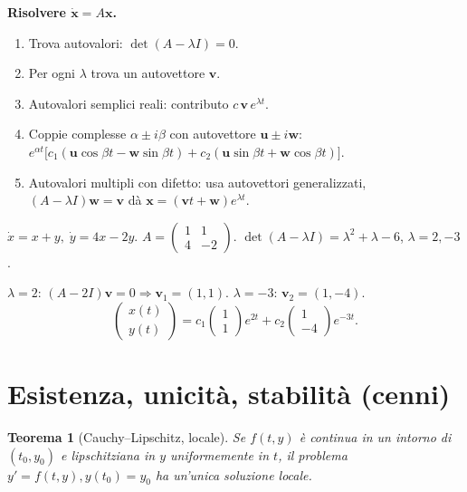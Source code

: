 \documentclass[11pt,a4paper,openany]{book}
\theoremstyle{plain}
\newtheorem{teorema}{Teorema}[chapter]
\theoremstyle{definition}
\theoremstyle{remark}
\renewcommand{\vec}[1]{\mathbf{#1}}
\begin{document}
\begin{ricetta}
\textbf{Risolvere $\dot{\vec{x}}=A\vec{x}$.}
\begin{enumerate}[leftmargin=*]
  \item Trova autovalori: $\det(A-\lambda I)=0$.
  \item Per ogni $\lambda$ trova un autovettore $\vec{v}$.
  \item Autovalori semplici reali: contributo $c\,\vec{v}\,e^{\lambda t}$.
  \item Coppie complesse $\alpha\pm i\beta$ con autovettore $\vec{u}\pm i\vec{w}$:
        $e^{\alpha t}\bigl[c_1(\vec{u}\cos\beta t-\vec{w}\sin\beta t)
        +c_2(\vec{u}\sin\beta t+\vec{w}\cos\beta t)\bigr]$.
  \item Autovalori multipli con difetto: usa autovettori generalizzati,
        $(A-\lambda I)\vec{w}=\vec{v}$ d\`a $\vec{x}=(\vec{v}t+\vec{w})e^{\lambda t}$.
\end{enumerate}
\end{ricetta}

\begin{esempio}
$\dot{x}=x+y,\;\dot{y}=4x-2y$. $A=\begin{pmatrix}1&1\\4&-2\end{pmatrix}$.
$\det(A-\lambda I)=\lambda^2+\lambda-6$, $\lambda=2,-3$.

$\lambda=2$: $(A-2I)\vec{v}=0\Rightarrow\vec{v}_1=(1,1)$.
$\lambda=-3$: $\vec{v}_2=(1,-4)$.
\[
  \begin{pmatrix}x(t)\\y(t)\end{pmatrix}
  =c_1\begin{pmatrix}1\\1\end{pmatrix}e^{2t}
  +c_2\begin{pmatrix}1\\-4\end{pmatrix}e^{-3t}.
\]
\end{esempio}

\section{Esistenza, unicit\`a, stabilit\`a (cenni)}

\begin{teorema}[Cauchy--Lipschitz, locale]
Se $f(t,y)$ \`e continua in un intorno di $(t_0,y_0)$ e \emph{lipschitziana
in $y$} uniformemente in $t$, il problema $y'=f(t,y),y(t_0)=y_0$ ha un'unica
soluzione locale.
\end{teorema}
\end{document}
